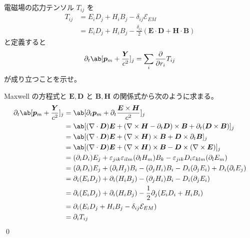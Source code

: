 \documentclass[uplatex,dvipdfmx,a4paper,11pt]{jlreq}
\makeatletter
\newcommand{\EE}{\bm{E}}
\newcommand{\DD}{\bm{D}}
\newcommand{\BB}{\bm{B}}
\newcommand{\HH}{\bm{H}}
\newcommand{\pp}{\bm{p}}
\newcommand{\vnabla}{\mathbf{\nabla}}
\numberwithin{equation}{section}
\theoremstyle{definition}
\renewenvironment{proof}[1][\proofname]{\par
  \normalfont
  \topsep6\p@\@plus6\p@ \trivlist
  \item[\hskip\labelsep{\bfseries #1}\@addpunct{\bfseries}]\ignorespaces\quad\par
}{%
  \qed\endtrivlist\@endpefalse
}
\renewcommand\proofname{証明}
\makeatother
\begin{document}
\begin{problem}
電磁場の応力テンソル $T_{ij}$ を
\begin{align}
  T_{ij} & = E_iD_j + H_iB_j - \delta_{ij}\mathcal{E}_{EM}                      \\
         & = E_iD_j + H_iB_j - \frac{\delta_{ij}}{2}(\EE\cdot\DD + \HH\cdot\BB)
\end{align}
と定義すると
\begin{align}
  \partial_t\ab[\pp_m + \frac{\bm{Y}}{c^2}]_j = \sum_{i}\diffp{}{r_i}T_{ij}
\end{align}
が成り立つことを示せ。
\end{problem}
\begin{proof}
  Maxwell の方程式と $\EE, \DD$ と $\BB, \HH$ の関係式から次のように求まる。
  \begin{align}
    \partial_t\ab[\pp_m + \frac{\bm{Y}}{c^2}]_j & = \ab[\partial_t\pp_m + \partial_t\frac{\EE\times\HH}{c^2}]_j                                                                      \\
                                                & = \ab[(\vnabla\cdot\DD)\EE + (\vnabla\times\HH - \partial_t\DD)\times\BB + \partial_t(\DD\times\BB)]_j                             \\
                                                & = \ab[(\vnabla\cdot\DD)\EE + (\vnabla\times\HH)\times\BB + \DD\times\partial_t\BB]_j                                               \\
                                                & = \ab[(\vnabla\cdot\DD)\EE + (\vnabla\times\HH)\times\BB - \DD\times(\vnabla\times\EE)]_j                                          \\
                                                & = (\partial_iD_i)E_j + \varepsilon_{jik}\varepsilon_{ilm}(\partial_lH_m)B_k - \varepsilon_{jik}D_i\varepsilon_{klm}(\partial_lE_m) \\
                                                & = (\partial_iD_i)E_j + (\partial_iH_j)B_i - (\partial_jH_i)B_i - D_i(\partial_jE_i) + D_i(\partial_iE_j)                           \\
                                                & = \partial_i(E_iD_j) + \partial_i(H_iB_j) - (\partial_jH_i)B_i - D_i(\partial_jE_i)                                                \\
                                                & = \partial_i(E_iD_j) + \partial_i(H_iB_j) - \frac{1}{2}\partial_j(E_iD_i + H_iB_i)                                                 \\
                                                & = \partial_i(E_iD_j + H_iB_j - \delta_{ij}\mathcal{E}_{EM})                                                                        \\
                                                & = \partial_iT_{ij}
  \end{align}
\end{proof}
\end{document}
